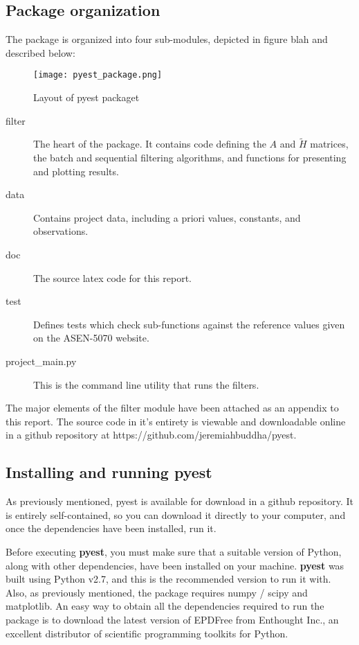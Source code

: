 \documentclass[10pt]{article}
\begin{document}
\subsection{Package organization}
The package is organized into four sub-modules, depicted in figure blah and described below:

\begin{figure}[htbp]
\begin{center}
\texttt{[image: pyest\_package.png]}
\caption{Layout of pyest packaget}
\end{center}
\end{figure}

\begin{description}
\item[filter] The heart of the package. It contains code defining the $A$ and $\tilde{H}$ matrices, the batch and sequential filtering algorithms, and functions for presenting and plotting results.
\item[data] Contains project data, including a priori values, constants, and observations.
\item[doc] The source latex code for this report.
\item[test] Defines tests which check sub-functions against the reference values given on the ASEN-5070 website.
\item[project\_main.py] This is the command line utility that runs the filters.
\end{description}

The major elements of the filter module have been attached as an appendix to this report. The source code in it's entirety is viewable and downloadable online in a github repository at https://github.com/jeremiahbuddha/pyest. 

\subsection{Installing and running \textbf{pyest}}

As previously mentioned, pyest is available for download in a github repository. It is entirely self-contained, so you can download it directly to your computer, and once the dependencies have been installed, run it.

Before executing \textbf{pyest}, you must make sure that a suitable version of Python, along with other dependencies, have been installed on your machine. \textbf{pyest} was built using Python v2.7, and this is the recommended version to run it with. Also, as previously mentioned, the package requires numpy / scipy and matplotlib. An easy way to obtain all the dependencies required to run the package is to download the latest version of EPDFree from Enthought Inc., an excellent distributor of scientific programming toolkits for Python.
\end{document}
